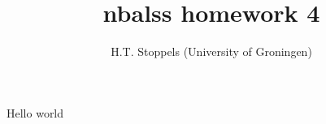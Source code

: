 \documentclass[a4paper]{article}
\author{H.T. Stoppels (University of Groningen)}
\title{{\sc nbalss} homework 4}
\begin{document}
  \maketitle 

  Hello world
\end{document}
